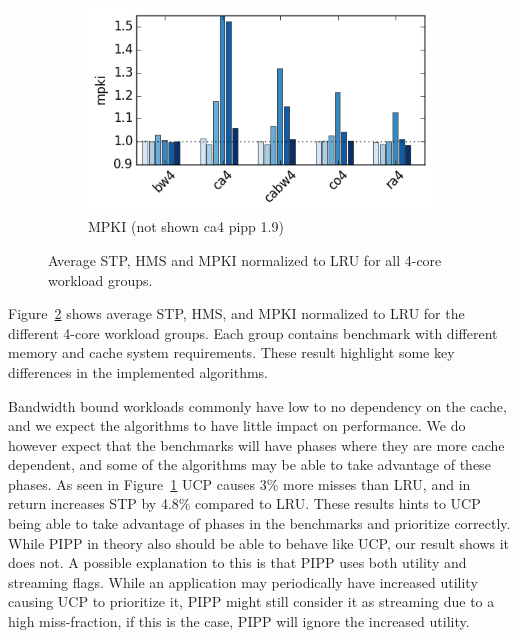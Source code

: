 \begin{figure}[t]
\begin{subfigure}[b]{0.3\textwidth}
        \includegraphics[width=\textwidth]{figures/results/avg-mpki-0128k-0100-4-avg}
        \caption{MPKI (not shown ca4 pipp 1.9)}
        \label{fig:results:base:4-avg:mpki}
    \end{subfigure}
    \caption[Average result for 4-core workloads]{Average STP, HMS and MPKI normalized to LRU for all 4-core workload groups.}
    \label{fig:results:base:4-avg} 
\end{figure}

Figure~\ref{fig:results:base:4-avg} shows average STP, HMS, and MPKI normalized to LRU for the different 4-core workload groups.
Each group contains benchmark with different memory and cache system requirements.
These result highlight some key differences in the implemented algorithms.

Bandwidth bound workloads commonly have low to no dependency on the cache, and we expect the algorithms to have little impact on performance.
We do however expect that the benchmarks will have phases where they are more cache dependent, and some of the algorithms may be able to take advantage of these phases.
As seen in Figure~\ref{fig:results:base:4-avg:mpki} UCP causes 3\% more misses than LRU, and in return increases STP by 4.8\% compared to LRU.
These results hints to UCP being able to take advantage of phases in the benchmarks and prioritize correctly.
While PIPP in theory also should be able to behave like UCP, our result shows it does not.
A possible explanation to this is that PIPP uses both utility and streaming flags.
While an application may periodically have increased utility causing UCP to prioritize it, PIPP might still consider it as streaming due to a high miss-fraction, if this is the case, PIPP will ignore the increased utility.


